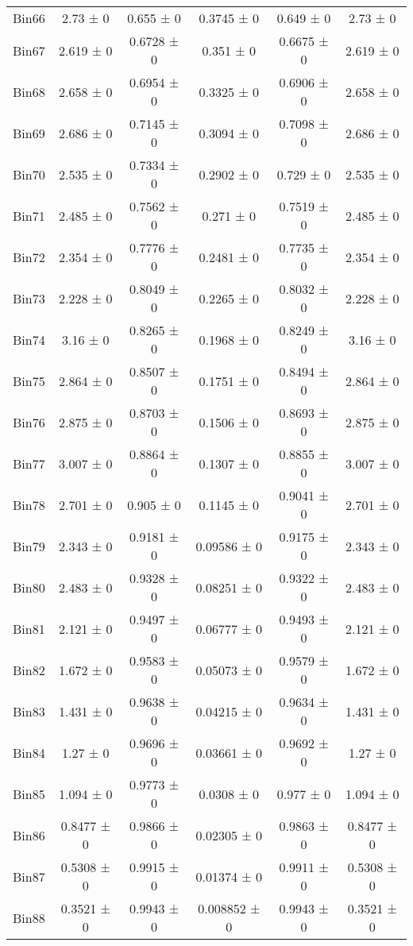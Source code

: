 \begin{tabular}{@{\extracolsep{4pt}}lccccc@{}}
     Bin66 & 2.73 ± 0 & 0.655 ± 0 & 0.3745 ± 0 & 0.649 ± 0 & 2.73 ± 0 \\ 
     Bin67 & 2.619 ± 0 & 0.6728 ± 0 & 0.351 ± 0 & 0.6675 ± 0 & 2.619 ± 0 \\ 
     Bin68 & 2.658 ± 0 & 0.6954 ± 0 & 0.3325 ± 0 & 0.6906 ± 0 & 2.658 ± 0 \\ 
     Bin69 & 2.686 ± 0 & 0.7145 ± 0 & 0.3094 ± 0 & 0.7098 ± 0 & 2.686 ± 0 \\ 
     Bin70 & 2.535 ± 0 & 0.7334 ± 0 & 0.2902 ± 0 & 0.729 ± 0 & 2.535 ± 0 \\ 
     Bin71 & 2.485 ± 0 & 0.7562 ± 0 & 0.271 ± 0 & 0.7519 ± 0 & 2.485 ± 0 \\ 
     Bin72 & 2.354 ± 0 & 0.7776 ± 0 & 0.2481 ± 0 & 0.7735 ± 0 & 2.354 ± 0 \\ 
     Bin73 & 2.228 ± 0 & 0.8049 ± 0 & 0.2265 ± 0 & 0.8032 ± 0 & 2.228 ± 0 \\ 
     Bin74 & 3.16 ± 0 & 0.8265 ± 0 & 0.1968 ± 0 & 0.8249 ± 0 & 3.16 ± 0 \\ 
     Bin75 & 2.864 ± 0 & 0.8507 ± 0 & 0.1751 ± 0 & 0.8494 ± 0 & 2.864 ± 0 \\ 
     Bin76 & 2.875 ± 0 & 0.8703 ± 0 & 0.1506 ± 0 & 0.8693 ± 0 & 2.875 ± 0 \\ 
     Bin77 & 3.007 ± 0 & 0.8864 ± 0 & 0.1307 ± 0 & 0.8855 ± 0 & 3.007 ± 0 \\ 
     Bin78 & 2.701 ± 0 & 0.905 ± 0 & 0.1145 ± 0 & 0.9041 ± 0 & 2.701 ± 0 \\ 
     Bin79 & 2.343 ± 0 & 0.9181 ± 0 & 0.09586 ± 0 & 0.9175 ± 0 & 2.343 ± 0 \\ 
     Bin80 & 2.483 ± 0 & 0.9328 ± 0 & 0.08251 ± 0 & 0.9322 ± 0 & 2.483 ± 0 \\ 
     Bin81 & 2.121 ± 0 & 0.9497 ± 0 & 0.06777 ± 0 & 0.9493 ± 0 & 2.121 ± 0 \\ 
     Bin82 & 1.672 ± 0 & 0.9583 ± 0 & 0.05073 ± 0 & 0.9579 ± 0 & 1.672 ± 0 \\ 
     Bin83 & 1.431 ± 0 & 0.9638 ± 0 & 0.04215 ± 0 & 0.9634 ± 0 & 1.431 ± 0 \\ 
     Bin84 & 1.27 ± 0 & 0.9696 ± 0 & 0.03661 ± 0 & 0.9692 ± 0 & 1.27 ± 0 \\ 
     Bin85 & 1.094 ± 0 & 0.9773 ± 0 & 0.0308 ± 0 & 0.977 ± 0 & 1.094 ± 0 \\ 
     Bin86 & 0.8477 ± 0 & 0.9866 ± 0 & 0.02305 ± 0 & 0.9863 ± 0 & 0.8477 ± 0 \\ 
     Bin87 & 0.5308 ± 0 & 0.9915 ± 0 & 0.01374 ± 0 & 0.9911 ± 0 & 0.5308 ± 0 \\ 
     Bin88 & 0.3521 ± 0 & 0.9943 ± 0 & 0.008852 ± 0 & 0.9943 ± 0 & 0.3521 ± 0 \\ 

\end{tabular}
